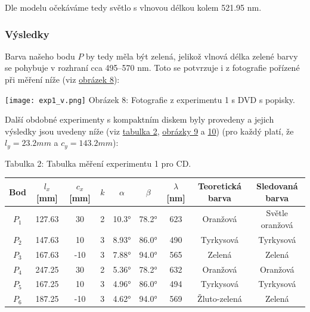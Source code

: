 \documentclass[titlepage]{article}
\begin{document}
Dle modelu očekáváme tedy světlo s vlnovou délkou kolem 521.95 nm.

\subsubsection{Výsledky}

Barva našeho bodu $P$ by tedy měla být zelená, jelikož vlnová délka zelené barvy se pohybuje v rozhraní cca 495–570 nm. Toto se potvrzuje i z fotografie pořízené při měření níže (viz \hyperref[image:8]{obrázek 8}):

 \label{image:8}
\begin{center}
    \texttt{[image: exp1\_v.png]}
    \linebreak
    Obrázek 8: Fotografie z experimentu 1 s DVD s popisky.
\end{center}

Další obdobné experimenty s kompaktním diskem byly provedeny a jejich výsledky jsou uvedeny níže (viz \hyperref[table:2]{tabulka 2}, \hyperref[image:9]{obrázky 9} a \hyperref[image:10]{10}) (pro každý platí, že $l_y = 23.2mm$ a $c_y = 143.2mm$):

\label{table:2}
\begin{center}
    Tabulka 2: Tabulka měření experimentu 1 pro CD. \\[3px]
    \begin{tabular}{ c | c | c  | c || c | c | c || c | c }
        Bod   & $l_x$ [mm] & $c_x$ [mm] & $k$ & $\alpha$ & $\beta$ & $\lambda$ [nm] & Teoretická barva & Sledovaná barva \\
        \hline
        $P_1$ & 127.63     & 30         & 2   & 10.3°    & 78.2°   & 623            & Oranžová         & Světle oranžová \\
        $P_2$ & 147.63     & 10         & 3   & 8.93°    & 86.0°   & 490            & Tyrkysová        & Tyrkysová       \\
        $P_3$ & 167.63     & -10        & 3   & 7.88°    & 94.0°   & 565            & Zelená           & Zelená          \\
        $P_4$ & 247.25     & 30         & 2   & 5.36°    & 78.2°   & 632            & Oranžová         & Oranžová        \\
        $P_5$ & 167.25     & 10         & 3   & 4.96°    & 86.0°   & 494            & Tyrkysová        & Tyrkysová       \\
        $P_6$ & 187.25     & -10        & 3   & 4.62°    & 94.0°   & 569            & Žluto-zelená     & Zelená          \\
        \hline
    \end{tabular}
\end{center}
\end{document}
